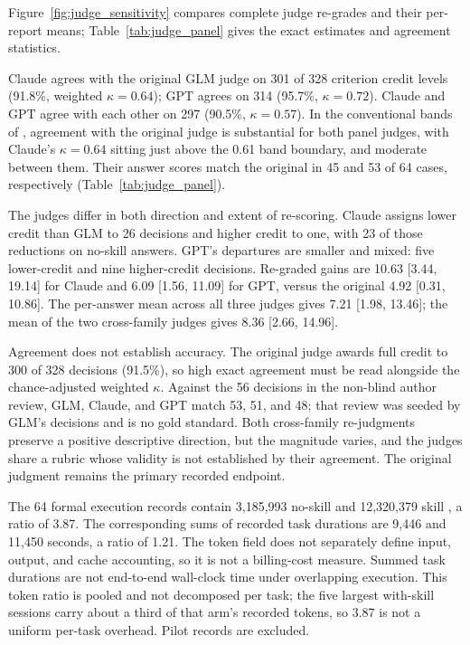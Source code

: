 \documentclass[11pt]{article}
\begin{document}
Figure~\ref{fig:judge_sensitivity} compares complete judge re-grades and their per-report means; Table~\ref{tab:judge_panel} gives the exact estimates and agreement statistics.




Claude agrees with the original GLM judge on 301 of 328 criterion credit levels (91.8\%, weighted $\kappa=0.64$); GPT agrees on 314 (95.7\%, $\kappa=0.72$). Claude and GPT agree with each other on 297 (90.5\%, $\kappa=0.57$). In the conventional bands of \citet{landis1977measurement}, agreement with the original judge is substantial for both panel judges, with Claude's $\kappa=0.64$ sitting just above the 0.61 band boundary, and moderate between them. Their answer scores match the original in 45 and 53 of 64 cases, respectively (Table~\ref{tab:judge_panel}).

The judges differ in both direction and extent of re-scoring. Claude assigns lower credit than GLM to 26 decisions and higher credit to one, with 23 of those reductions on no-skill answers. GPT's departures are smaller and mixed: five lower-credit and nine higher-credit decisions. Re-graded gains are 10.63 [3.44, 19.14] for Claude and 6.09 [1.56, 11.09] for GPT, versus the original 4.92 [0.31, 10.86]. The per-answer mean across all three judges gives 7.21 [1.98, 13.46]; the mean of the two cross-family judges gives 8.36 [2.66, 14.96].

Agreement does not establish accuracy. The original judge awards full credit to 300 of 328 decisions (91.5\%), so high exact agreement must be read alongside the chance-adjusted weighted $\kappa$. Against the 56 decisions in the non-blind author review, GLM, Claude, and GPT match 53, 51, and 48; that review was seeded by GLM's decisions and is no gold standard. Both cross-family re-judgments preserve a positive descriptive direction, but the magnitude varies, and the judges share a rubric whose validity is not established by their agreement. The original judgment remains the primary recorded endpoint.

The 64 formal execution records contain 3,185,993 no-skill and 12,320,379 skill , a ratio of 3.87. The corresponding sums of recorded task durations are 9,446 and 11,450 seconds, a ratio of 1.21. The token field does not separately define input, output, and cache accounting, so it is not a billing-cost measure. Summed task durations are not end-to-end wall-clock time under overlapping execution. This token ratio is pooled and not decomposed per task; the five largest with-skill sessions carry about a third of that arm's recorded tokens, so 3.87 is not a uniform per-task overhead. Pilot records are excluded.
\end{document}
